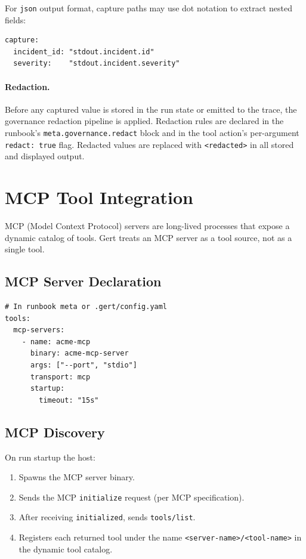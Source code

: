 For \texttt{json} output format, capture paths may use dot notation to extract
nested fields:

\begin{verbatim}
capture:
  incident_id: "stdout.incident.id"
  severity:    "stdout.incident.severity"
\end{verbatim}

\paragraph{Redaction.}
Before any captured value is stored in the run state or emitted to the trace,
the governance redaction pipeline is applied.  Redaction rules are declared in
the runbook's \texttt{meta.governance.redact} block and in the tool action's
per-argument \texttt{redact: true} flag.  Redacted values are replaced with
\texttt{<redacted>} in all stored and displayed output.

\section{MCP Tool Integration}
\label{sec:mcp-tools}

MCP (Model Context Protocol) servers are long-lived processes that expose a
dynamic catalog of tools.  Gert treats an MCP server as a tool source, not as
a single tool.

\subsection{MCP Server Declaration}

\begin{verbatim}
# In runbook meta or .gert/config.yaml
tools:
  mcp-servers:
    - name: acme-mcp
      binary: acme-mcp-server
      args: ["--port", "stdio"]
      transport: mcp
      startup:
        timeout: "15s"
\end{verbatim}

\subsection{MCP Discovery}

On run startup the host:

\begin{enumerate}
  \item Spawns the MCP server binary.
  \item Sends the MCP \texttt{initialize} request (per MCP specification).
  \item After receiving \texttt{initialized}, sends \texttt{tools/list}.
  \item Registers each returned tool under the name
        \texttt{<server-name>/<tool-name>} in the dynamic tool catalog.
\end{enumerate}

